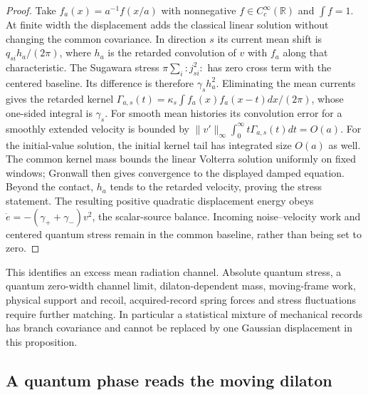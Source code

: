 \begin{proof}
Take $f_a(x)=a^{-1}f(x/a)$ with nonnegative $f\in C_c^\infty(\mathbb R)$
and $\int f=1$. At finite width the displacement adds the classical
linear solution without changing the common covariance. In direction $s$
its current mean shift is $q_{si}h_a/(2\pi)$, where $h_a$ is the retarded
convolution of $v$ with $f_a$ along that characteristic. The Sugawara
stress $\pi\sum_i:j_{si}^2:$ has zero cross term with the centered
baseline. Its difference is therefore $\gamma_s h_a^2$.
Eliminating the mean currents gives the retarded kernel
$\Gamma_{a,s}(t)=\kappa_s\int f_a(x)f_a(x-t)dx/(2\pi)$, whose
one-sided integral is $\gamma_s$. For smooth mean histories its
convolution error for a smoothly extended velocity is bounded by
$\|v'\|_\infty\int_0^\infty t\Gamma_{a,s}(t)dt=O(a)$.
For the initial-value solution, the initial kernel tail has integrated
size $O(a)$ as well. The common kernel mass bounds the linear Volterra
solution uniformly on fixed windows; Gronwall then gives convergence
to the displayed damped equation. Beyond the contact, $h_a$ tends to
the retarded velocity, proving the stress statement. The resulting
positive quadratic displacement energy obeys
$\dot e=-(\gamma_++\gamma_-)v^2$, the scalar-source balance.
Incoming noise--velocity work and centered quantum stress remain in
the common baseline, rather than being set to zero.
\end{proof}

This identifies an excess mean radiation channel. Absolute quantum
stress, a quantum zero-width channel limit, dilaton-dependent mass,
moving-frame work, physical support and recoil, acquired-record spring
forces and stress fluctuations require further matching. In particular
a statistical mixture of mechanical records has branch covariance
and cannot be replaced by one Gaussian displacement in this proposition.

\subsection{A quantum phase reads the moving dilaton}
\label{sec:material-dilaton-probe}

